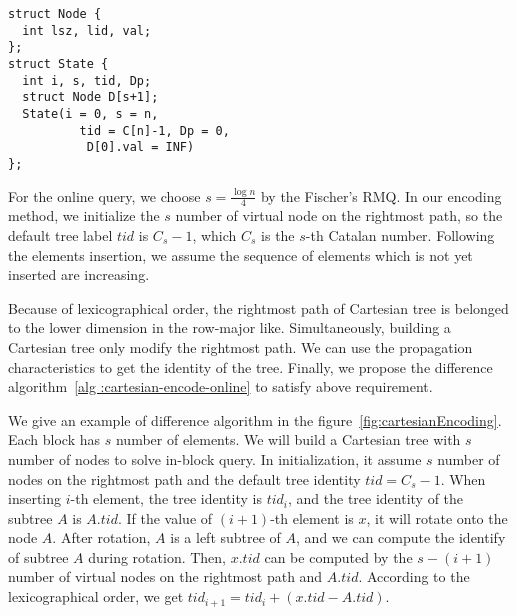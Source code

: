\iffalse
我們定義轉移狀態由 5 個變數來決定動態笛卡爾樹的編碼，當前插入第 $i$ 個
元素，最終填充 $s$ 個元素，當前的樹編號 $\mathit{tid}$，以及笛卡爾樹的
右鏈狀態指針 $Dp$ 與其堆疊 $D$，其結構如下：
\fi

\begin{minipage}{0.9\linewidth}
\begin{lstlisting}[frame=single,caption=State of Cartesian Tree]
struct Node {
  int lsz, lid, val;
};
struct State {
  int i, s, tid, Dp;
  struct Node D[s+1];
  State(i = 0, s = n, 
          tid = C[n]-1, Dp = 0,
           D[0].val = INF)
};
\end{lstlisting}
\end{minipage}

For the online query, we choose $s=\frac{\log n}{4}$ by the Fischer's
RMQ.  In our encoding method, we initialize the $s$ number of virtual
node on the rightmost path, so the default tree label $\mathit{tid}$
is $C_s - 1$, which $C_s$ is the $s$-th Catalan number.  Following the
elements insertion, we assume the sequence of elements which is not
yet inserted are increasing.

Because of lexicographical order, the rightmost path of Cartesian tree
is belonged to the lower dimension in the row-major like.
Simultaneously, building a Cartesian tree only modify the rightmost
path. We can use the propagation characteristics to get the identity of
the tree.  Finally, we propose the difference algorithm~\ref{alg
:cartesian-encode-online} to satisfy above requirement.

\iffalse 為了解決在線詢問操作，取 $s = \frac{\log n}{4}$。根據字典順序
的編碼性質，一開始建立虛設點 $s$ 個在右鏈上，其樹編號 $\mathit{tid} =
C_s - 1$ 。隨著插入元素的增加，尚未加入的元素都預設嚴格遞減，加上根據
編碼順序，我們藉由差值來維護在線編碼 (如圖
~\ref{fig:cartesianEncoding})。根據上述的編碼想法，我們得到算法
~\ref{alg:cartesian-encode-online}。\fi

We give an example of difference algorithm in the
figure~\ref{fig:cartesianEncoding}.  Each block has $s$ number of
elements.  We will build a Cartesian tree with $s$ number of nodes to
solve in-block query.  In initialization, it assume $s$ number of
nodes on the rightmost path and the default tree identity
$\mathit{tid} = C_s - 1$.  When inserting $i$-th element, the tree
identity is $\mathit{tid}_i$, and the tree identity of the subtree $A$
is $A.\mathit{tid}$.  If the value of $(i+1)$-th element is $x$, it
will rotate onto the node $A$.  After rotation, $A$ is a left subtree
of $A$, and we can compute the identify of subtree $A$ during
rotation.  Then, $x.\mathit{tid}$ can be computed by the $s-(i+1)$
number of virtual nodes on the rightmost path and
$A.\mathit{tid}$. According to the lexicographical order, we get
$\mathit{tid}_{i+1} = \mathit{tid}_i + (x.\mathit{tid} -
A.\mathit{tid})$.

